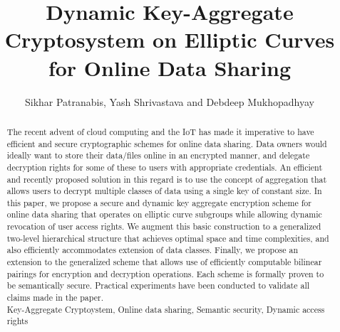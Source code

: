 \documentclass{class/llncs}
\title{Dynamic Key-Aggregate Cryptosystem on Elliptic Curves for Online Data Sharing}
\begin{document}
% 

\author{Sikhar Patranabis, Yash Shrivastava and Debdeep Mukhopadhyay}
\maketitle
{}


\begin{abstract}
The recent advent of cloud computing and the IoT has made it imperative to have efficient and secure cryptographic schemes for online data sharing. Data owners would ideally want to store their data/files online in an encrypted manner, and delegate decryption rights for some of these to users with appropriate credentials. An efficient and recently proposed solution in this regard is to use the concept of aggregation that allows users to decrypt multiple classes of data using a single key of constant size. In this paper, we propose a secure and dynamic key aggregate encryption scheme for online data sharing that operates on elliptic curve subgroups while allowing dynamic revocation of user access rights. We augment this basic construction to a generalized two-level hierarchical structure that achieves optimal space and time complexities, and also efficiently accommodates extension of data classes. Finally, we propose an extension to the generalized scheme that allows use of efficiently computable bilinear 
pairings for encryption and decryption operations. Each scheme is formally proven to be semantically secure. Practical experiments have been conducted to validate all claims made in the paper.\\
 Key-Aggregate Cryptoystem, Online data sharing, Semantic security, Dynamic access rights
\end{abstract}










\begin{scriptsize}


\end{scriptsize}

\newpage

\end{document}
